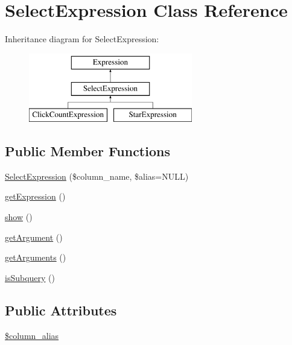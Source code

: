 \hypertarget{classSelectExpression}{}\section{Select\+Expression Class Reference}
\label{classSelectExpression}
Inheritance diagram for Select\+Expression\+:\begin{figure}[H]
\begin{center}
\leavevmode
\includegraphics[height=3.000000cm]{classSelectExpression}
\end{center}
\end{figure}
\subsection*{Public Member Functions}
\begin{DoxyCompactItemize}
\item 
\hyperlink{classSelectExpression_abc497194c4a6ec6543f594d314f26143}{Select\+Expression} (\$column\+\_\+name, \$alias=N\+U\+LL)
\item 
\hyperlink{classSelectExpression_a860e81d13389a53617fa27c377aa4e2c}{get\+Expression} ()
\item 
\hyperlink{classSelectExpression_ad6fe2f8979f56814a8b09de05fa2b5a6}{show} ()
\item 
\hyperlink{classSelectExpression_a1311337274f53d0f3705673e86990a0b}{get\+Argument} ()
\item 
\hyperlink{classSelectExpression_a41d457ce5fc7cedc050c2c34a2286d9f}{get\+Arguments} ()
\item 
\hyperlink{classSelectExpression_a9b827b574a24dbbaa54932a639d8d5aa}{is\+Subquery} ()
\end{DoxyCompactItemize}
\subsection*{Public Attributes}
\begin{DoxyCompactItemize}
\item 
\hyperlink{classSelectExpression_ae74dfde6f65f67f6cfadb3f992f2c3b9}{\$column\+\_\+alias}
\end{DoxyCompactItemize}


